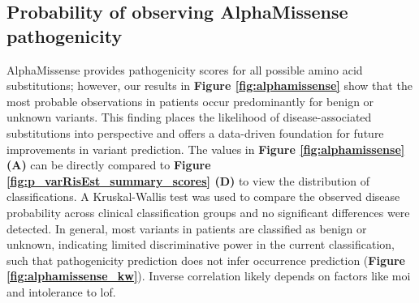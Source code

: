 \FloatBarrier
\subsection{Probability of observing AlphaMissense pathogenicity}
AlphaMissense provides pathogenicity scores for all possible amino acid substitutions; however, our results in \textbf{Figure \ref{fig:alphamissense}} show that the most probable observations in patients occur predominantly for benign or unknown variants. This finding places the likelihood of disease-associated substitutions into perspective and offers a data-driven foundation for future improvements in variant prediction. The values in 
\textbf{Figure \ref{fig:alphamissense} (A)} can be directly compared to 
\textbf{Figure \ref{fig:p_varRisEst_summary_scores} (D)} to view the distribution of classifications.
A Kruskal-Wallis test was used to compare the observed disease probability across clinical classification groups and no significant differences were detected. In general, most variants in patients are classified as benign or unknown, indicating limited discriminative power in the current classification, such that pathogenicity prediction does not infer occurrence prediction (\textbf{Figure \ref{fig:alphamissense_kw}}).
Inverse correlation likely depends on factors like \ac{moi} and intolerance to \ac{lof}.
  
